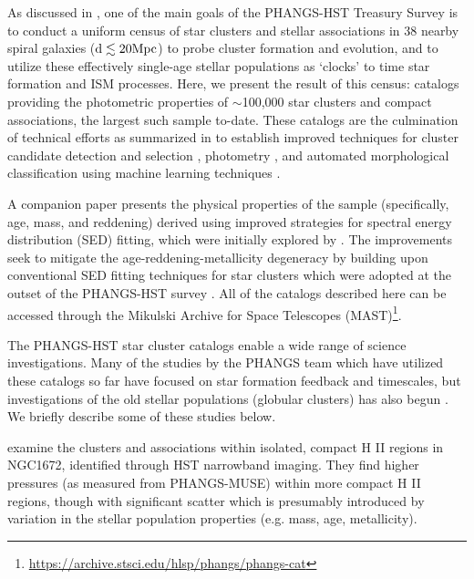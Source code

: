 \documentclass[linenumbers]{aastex63}
\begin{document}
As discussed in \cite{lee_phangs-hst_2022}, one of the main goals of the PHANGS-HST Treasury Survey is to conduct a uniform census of star clusters and stellar associations in 38 nearby spiral galaxies (${\rm d \lesssim 20 Mpc}$) to probe cluster formation and evolution, and to utilize these effectively single-age stellar populations as `clocks' to time star formation and ISM processes.  Here, we present the result of this census: catalogs providing the photometric properties of $\sim$100,000 star clusters and compact associations, the largest such sample to-date.  These catalogs are the culmination of technical efforts as summarized in \cite{lee_phangs-hst_2022} to establish improved techniques for cluster candidate detection and selection \citep{whitmore_star_2021, thilker_phangs-hst_2022}, photometry \citep{deger_bright_2022}, and automated morphological classification using machine learning techniques \citep{wei_deep_2020, whitmore_star_2021, hannon_star_2023}.  

A companion paper \citep[][hereafter Paper II]{thilker23sed} presents the physical properties of the sample (specifically, age, mass, and reddening) derived using improved strategies for spectral energy distribution (SED) fitting, which were initially explored by \citet{whitmore_improving_2023}.  The improvements seek to mitigate the age-reddening-metallicity degeneracy by building upon conventional SED fitting techniques for star clusters which were adopted at the outset of the PHANGS-HST survey \citep{turner_phangs-hst_2021}.  All of the catalogs described here can be accessed through the Mikulski Archive for Space Telescopes (MAST)\footnote{\url{https://archive.stsci.edu/hlsp/phangs/phangs-cat}}.


The PHANGS-HST star cluster catalogs enable a wide range of science investigations. Many of the studies by the PHANGS team which have utilized these catalogs so far have focused on star formation feedback and timescales, but investigations of the old stellar populations (globular clusters) has also begun \citep{floyd}. We briefly describe some of these studies below.

\citet{barnes_linking_2022} examine the clusters and associations within isolated, compact H II regions in NGC1672, identified through HST narrowband imaging.  They find higher pressures (as measured from PHANGS-MUSE) within more compact H II regions, though with significant scatter which is presumably introduced by variation in the stellar population properties (e.g. mass, age, metallicity). 
\end{document}
